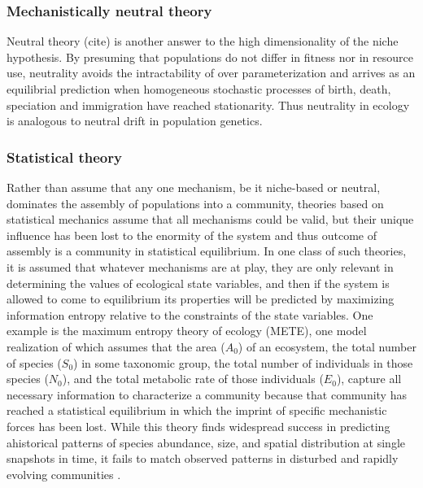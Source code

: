 \documentclass[12pt]{article}
\begin{document}
\subsubsection{Mechanistically neutral theory}

Neutral theory (cite) is another answer to the high dimensionality of
the niche hypothesis. By presuming that populations do not differ in
fitness nor in resource use, neutrality avoids the intractability of
over parameterization and arrives as an equilibrial prediction when
homogeneous stochastic processes of birth, death, speciation and
immigration have reached stationarity. Thus neutrality in ecology is
analogous to neutral drift in population genetics.

\subsubsection{Statistical theory}

Rather than assume that any one mechanism, be it niche-based or
neutral, dominates the assembly of populations into a community,
theories based on statistical mechanics assume that all mechanisms
could be valid, but their unique influence has been lost to the
enormity of the system and thus outcome of assembly is a community in
statistical equilibrium. In one class of such theories, it is assumed
that whatever mechanisms are at play, they are only relevant in
determining the values of ecological state variables, and then if the
system is allowed to come to equilibrium its properties will be
predicted by maximizing information entropy relative to the
constraints of the state variables.  One example is the maximum
entropy theory of ecology (METE), one model realization of which
assumes that the area ($A_0$) of an ecosystem, the total number of species
($S_0$) in some taxonomic group, the total number of individuals in those
species ($N_0$), and the total metabolic rate of those individuals ($E_0$),
capture all necessary information to characterize a community because
that community has reached a statistical equilibrium in which the
imprint of specific mechanistic forces has been lost. While this
theory finds widespread success in predicting ahistorical patterns of
species abundance, size, and spatial distribution \cite{Harte2011-um,
  White2012-yw, Xiao2015-jv, Harte2009-zq} at single snapshots in
time, it fails to match observed patterns in disturbed and rapidly
evolving communities \cite{Rominger2015-kb,Harte2011-um}.
\end{document}
